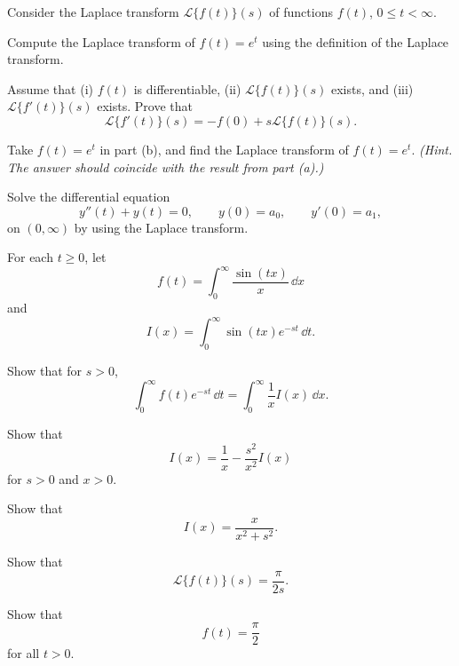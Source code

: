 \begin{problem}
Consider the Laplace transform $\mathcal{L}\{f(t)\}(s)$ of functions $f(t)$, $0\le t<\infty$.
\begin{problemsubparts}
\item Compute the Laplace transform of $f(t)=e^t$ using the definition of the Laplace transform.
\item Assume that (i) $f(t)$ is differentiable, (ii) $\mathcal{L}\{f(t)\}(s)$ exists, and (iii) $\mathcal{L}\{f'(t)\}(s)$ exists. Prove that
\[
\mathcal{L}\{f'(t)\}(s)=-f(0)+s\mathcal{L}\{f(t)\}(s).
\]
\item Take $f(t)=e^t$ in part (b), and find the Laplace transform of $f(t)=e^t$. \textit{(Hint. The answer should coincide with the result from part (a).)}
\item Solve the differential equation
\[
y''(t)+y(t)=0,
\qquad
y(0)=a_0,
\qquad
y'(0)=a_1,
\]
on $(0,\infty)$ by using the Laplace transform.
\end{problemsubparts}
\end{problem}

\begin{problem}
For each $t\ge0$, let
\[
f(t)=\int_0^\infty \frac{\sin(tx)}{x}\,\dd x
\]
and
\[
I(x)=\int_0^\infty \sin(tx)e^{-st}\,\dd t.
\]
\begin{problemsubparts}
\item Show that for $s>0$,
\[
\int_0^\infty f(t)e^{-st}\,\dd t
=\int_0^\infty \frac{1}{x}I(x)\,\dd x.
\]
\item Show that
\[
I(x)=\frac1x-\frac{s^2}{x^2}I(x)
\]
for $s>0$ and $x>0$.
\item Show that
\[
I(x)=\frac{x}{x^2+s^2}.
\]
\item Show that
\[
\mathcal{L}\{f(t)\}(s)=\frac{\pi}{2s}.
\]
\item Show that
\[
f(t)=\frac{\pi}{2}
\]
for all $t>0$.
\end{problemsubparts}
\end{problem}

